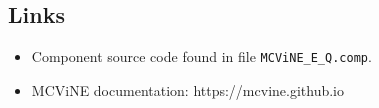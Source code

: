 \subsection*{Links}
\begin{itemize}
  \item Component source code found in file \texttt{MCViNE\_E\_Q.comp}.
  \item MCViNE documentation: https://mcvine.github.io
\end{itemize}
